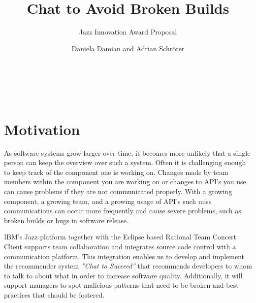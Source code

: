 \documentclass{sig-alternate}
\begin{document}
\title{\vspace{-15pt}Chat to Avoid Broken Builds}
\subtitle{\vspace{-18pt}Jazz Innovation Award Proposal\vspace{-8pt}}
\author{
\alignauthor
Daniela Damian and Adrian Schr\"oter \\
       \\
       \\
       \\
       \\
       \vspace{-200pt}
}

\maketitle


\section{Motivation}
As software systems grow larger over time, it becomes more unlikely that a single person can keep the overview over such a system.
Often it is challenging enough to keep track of the component one is working on.
Changes made by team members within the component you are working on or changes to API's you use can cause problems if they are not communicated properly.
With a growing component, a growing team, and a growing usage of API's such miss communications can occur more frequently and cause severe problems, such as broken builds or bugs in software release.

IBM's Jazz platform together with the Eclipse based Rational Team Concert Client supports team collaboration and integrates source code control with a communication platform.
This integration enables us to develop and implement the recommender system \emph{''Chat to Succeed''} that recommends developers to whom to talk to about what in order to increase software quality.
Additionally, it will support managers to spot malicious patterns that need to be broken and best practices that should be fostered.
\end{document}

